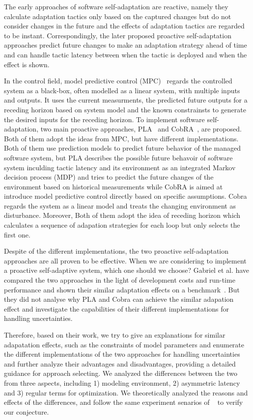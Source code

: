 \documentclass[sigconf]{acmart}
\begin{document}
The early approaches of software self-adaptation are reactive, namely they calculate adaptation tactics only based on the captured changes but do not consider changes in the future and the effects of adaptation tactics are regarded to be instant. Correspondingly, the later proposed proactive self-adaptation approaches predict future changes to make an adaptation strategy ahead of time and can handle tactic latency between when the tactic is deployed and when the effect is shown.

In the control field, model predictive control (MPC)~\cite{qin2003survey} regards the controlled system as a black-box, often modelled as a linear system, with multiple inputs and outputs. It uses the current measurments, the predicted future outputs for a receding horizon based on system model and the known constrainsts to generate the desired inputs for the receding horizon. To implement software self-adaptation, two main proactive approaches, PLA~\cite{moreno2015proactive} and CobRA~\cite{angelopoulos2016model}, are proposed. Both of them adopt the ideas from MPC, but have different implementations. Both of them use prediction models to predict future behavior of the managed software system, but PLA describes the possible future behavoir of software system inculding tactic latency and its environment as an integrated Markov decision process (MDP) and tries to predict the future changes of the environment based on historical measurements while CobRA is aimed at introduce model predictive control directly based on specific assumptions. Cobra regards the system as a linear model and treats the changing environment as disturbance. Moreover, Both of them adopt the idea of receding horizon which calculates a sequence of adapation strategies for each loop but only selects the first one. 

Despite of the different implementations, the two proactive self-adaptation approaches are all proven to be effective. When we are considering to implement a proactive self-adaptive system, which one should we choose? Gabriel et al. have compared the two approaches in the light of development costs and run-time performance and shown their similar adaptation effects on a benchmark~\cite{moreno2017comparing}. But they did not analyse why PLA and Cobra can achieve the similar adapation effect and investigate the capabilities of their different implementations for handling uncertainties. 

Therefore, based on their work, we try to give an explanations for similar adapatation effects, such as the constraints of model parameters and enumerate the different implementations of the two approaches for handling uncertainties and further analyze their advantages and disadvantages, providing a detailed guidance for approach selecting. We analyzed the differences between the two from three aspects, including 1) modeling environment, 2) asymmetric latency and 3) regular terms for optimization. We theoretically analyzed the reasons and effects of the differences, and follow the same experiment senarios of ~\cite{moreno2017comparing} to verify our conjecture.
\end{document}
